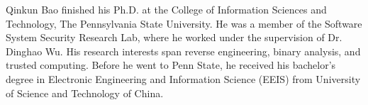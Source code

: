 
Qinkun Bao finished his Ph.D. at the College of Information Sciences
and Technology, The Pennsylvania State University. He was a member of the Software 
System Security Research Lab, where he worked under the supervision of Dr. Dinghao Wu.
His research interests span reverse engineering, binary analysis, and trusted computing. Before he went to Penn State, he received his bachelor's degree in Electronic Engineering and Information Science (EEIS) from University of Science and Technology of China.


 